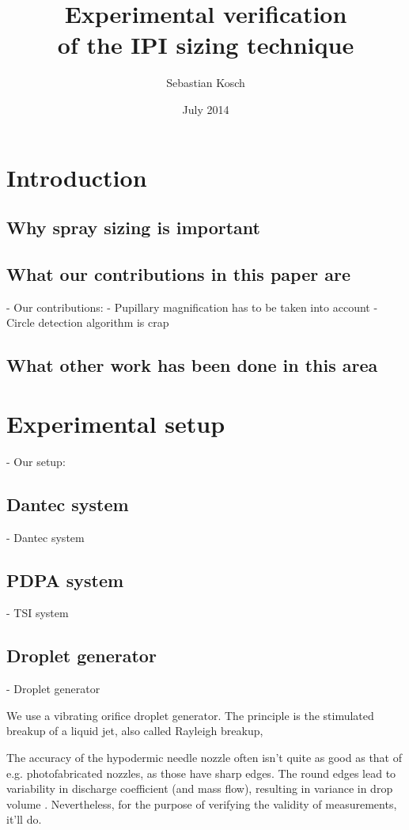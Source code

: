 \documentclass[10pt]{book}
\begin{document}
\title{Experimental verification\\ of the IPI sizing technique}
\author{Sebastian Kosch}
\date{July 2014}
\maketitle

\printnomenclature[5em]

\chapter{Introduction}
\section{Why spray sizing is important}
\section{What our contributions in this paper are}
- Our contributions:
    - Pupillary magnification has to be taken into account
    - Circle detection algorithm is crap
\section{What other work has been done in this area}

\chapter{Experimental setup}
- Our setup:
\section{Dantec system}
    - Dantec system
\section{PDPA system}
    - TSI system
\section{Droplet generator}
\label{sec:droplet-generator}
    - Droplet generator

We use a vibrating orifice droplet generator. The principle is the stimulated
breakup of a liquid jet, also called Rayleigh breakup, 

The accuracy of the hypodermic needle nozzle often isn't quite as good as that of e.g.
photofabricated nozzles, as those have sharp edges. The round edges lead to
variability in discharge coefficient (and mass flow), resulting in variance in
drop volume \cite{Dressler90}. Nevertheless, for the purpose of verifying the validity of
measurements, it'll do.
\end{document}
